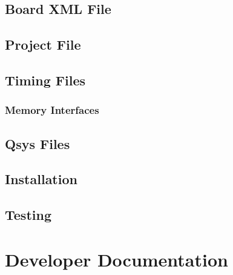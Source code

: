 \documentclass{refrep}
\begin{document}
\section{Board XML File}
\label{Chapter:Adding:Section:XML}

\section{Project File}
\label{Chapter:Adding:Section:Project}
\section{Timing Files}
\label{Chapter:Adding:Section:Timing}
\subsection{Memory Interfaces}
\label{Chapter:Adding:Section:Project:Sub:Memories}
\section{Qsys Files}
\label{Chapter:Adding:Section:Qsys}
\section{Installation}
\label{Chapter:Adding:Section:Installation}
\section{Testing}
\label{Chapter:Adding:Section:Testing}
\pagebreak
\chapter{Developer Documentation}
\label{Chap:Tinker:Adding}
\end{document}
